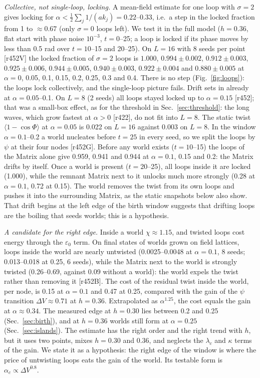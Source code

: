 \documentclass[reprint,pre,amsmath,amssymb,superscriptaddress,nofootinbib]{revtex4-2}
\begin{document}
\emph{Collective, not single-loop, locking.} A mean-field estimate for one loop with $\sigma=2$ gives locking for $\alpha<\tfrac12\sum_j1/(ak_j)=0.22$--0.33, i.e.\ a step in the locked fraction from 1 to $\approx0.67$ (only $\sigma=0$ loops left). We test it in the full model ($h=0.36$, flat start with phase noise $10^{-3}$, $t=0$--25; a loop is locked if its phase moves by less than 0.5 rad over $t=10$--15 and 20--25). On $L=16$ with 8 seeds per point [r452V] the locked fraction of $\sigma=2$ loops is $1.000$, $0.994\pm0.002$, $0.912\pm0.003$, $0.925\pm0.006$, $0.944\pm0.005$, $0.940\pm0.003$, $0.922\pm0.004$ and $0.880\pm0.005$ at $\alpha=0$, 0.05, 0.1, 0.15, 0.2, 0.25, 0.3 and 0.4. There is no step (Fig.~\ref{fig:loops}): the loops lock collectively, and the single-loop picture fails. Drift sets in already at $\alpha=0.05$--0.1. On $L=8$ (2 seeds) all loops stayed locked up to $\alpha=0.15$ [r452]; that was a small-box effect, as for the threshold in Sec.~\ref{sec:threshold}: the long waves, which grow fastest at $\alpha>0$ [r422], do not fit into $L=8$. The static twist $\langle1-\cos\Phi\rangle$ at $\alpha=0.05$ is 0.022 on $L=16$ against 0.003 on $L=8$. In the window $\alpha=0.1$--0.2 a world nucleates before $t=25$ in every seed, so we split the loops by $\psi$ at their four nodes [r452G]. Before any world exists ($t=10$--15) the loops of the Matrix alone give 0.959, 0.941 and 0.944 at $\alpha=0.1$, 0.15 and 0.2: the Matrix drifts by itself. Once a world is present ($t=20$--25), all loops inside it are locked (1.000), while the remnant Matrix next to it unlocks much more strongly (0.28 at $\alpha=0.1$, 0.72 at 0.15). The world removes the twist from its own loops and pushes it into the surrounding Matrix, as the static snapshots below also show. That drift begins at the left edge of the birth window suggests that drifting loops are the boiling that seeds worlds; this is a hypothesis.

\emph{A candidate for the right edge.} Inside a world $\chi\approx1.15$, and twisted loops cost energy through the $\varepsilon_0$ term. On final states of worlds grown on field lattices, loops inside the world are nearly untwisted (0.0025--0.0048 at $\alpha=0.1$, 8 seeds; 0.013--0.018 at 0.25, 6 seeds), while the Matrix next to the world is strongly twisted (0.26--0.69, against 0.09 without a world): the world expels the twist rather than removing it [r452B]. The cost of the residual twist inside the world, per node, is 0.15 at $\alpha=0.1$ and 0.47 at 0.25, compared with the gain of the $\psi$ transition $\Delta V\approx0.71$ at $h=0.36$. Extrapolated as $\alpha^{1.25}$, the cost equals the gain at $\alpha\approx0.34$. The measured edge at $h=0.30$ lies between 0.2 and 0.25 (Sec.~\ref{sec:birth}), and at $h=0.36$ worlds still form at $\alpha=0.25$ (Sec.~\ref{sec:islands}). The estimate has the right order and the right trend with $h$, but it uses two points, mixes $h=0.30$ and 0.36, and neglects the $\lambda_c$ and $\kappa$ terms of the gain. We state it as a hypothesis: the right edge of the window is where the price of untwisting loops eats the gain of the world. Its testable form is $\alpha_c\propto\Delta V^{0.8}$.
\end{document}
